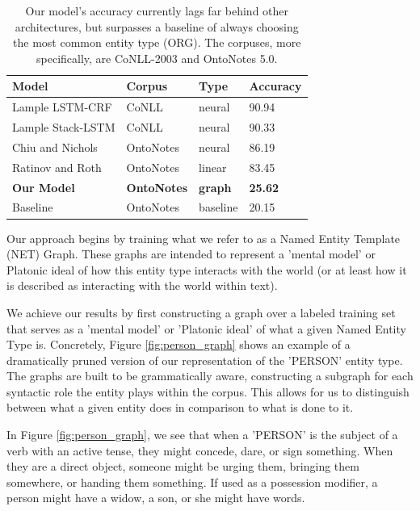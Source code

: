 \documentclass[11pt,a4paper]{article}
\begin{document}
\begin{table}[t]
\begin{tabular}{@{}llll@{}}
\toprule
Model              & Corpus          & Type           & Accuracy        \\ \midrule
Lample LSTM-CRF   &  CoNLL   & neural         & 90.94         \\
Lample Stack-LSTM   &  CoNLL   & neural         & 90.33          \\
Chiu and Nichols   & OntoNotes          & neural         & 86.19          \\
Ratinov and Roth   & OntoNotes          & linear         & 83.45          \\ \midrule
\textbf{Our Model} & \textbf{OntoNotes} & \textbf{graph} & \textbf{25.62} \\ \midrule
Baseline           & OntoNotes          & baseline       & 20.15         
\end{tabular}
\label{tab:state_of_art}
\caption{Our model's accuracy currently lags far behind other architectures, but surpasses a baseline of always choosing the most common entity type (ORG). The corpuses, more specifically, are CoNLL-2003 and OntoNotes 5.0.}
\end{table}

Our approach begins by training what we refer to as a Named Entity Template (NET) Graph. These graphs are intended to represent a 'mental model' or Platonic ideal of how this entity type interacts with the world (or at least how it is described as interacting with the world within text).

We achieve our results by first constructing a graph over a labeled training set that serves as a 'mental model' or 'Platonic ideal' of what a given Named Entity Type is. Concretely, Figure \ref{fig:person_graph} shows an example of a dramatically pruned version of our representation of the 'PERSON' entity type. The graphs are built to be grammatically aware, constructing a subgraph for each syntactic role the entity plays within the corpus. This allows for us to distinguish between what a given entity does in comparison to what is done to it.

In Figure \ref{fig:person_graph}, we see that when a 'PERSON' is the subject of a verb with an active tense, they might concede, dare, or sign something. When they are a direct object, someone might be urging them, bringing them somewhere, or handing them something. If used as a possession modifier, a person might have a widow, a son, or she might have words.
\end{document}
